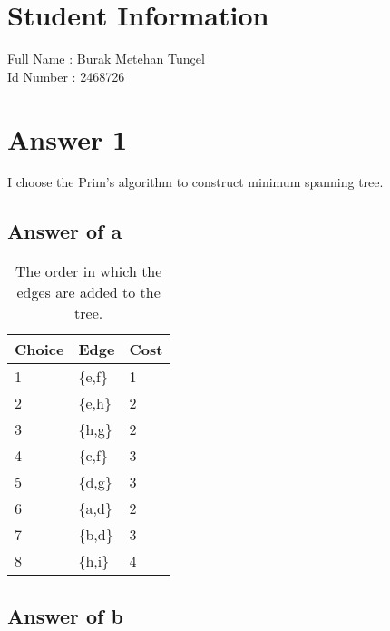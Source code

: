 \documentclass[12pt]{article}
\begin{document}
\section*{Student Information } 
Full Name :  Burak Metehan Tunçel \\
Id Number :  2468726 \\


\section*{Answer 1}

I choose the Prim's algorithm to construct minimum spanning tree.

\subsection*{Answer of a}

\begin{table}[h!]
    \centering
    \begin{tabular}{| p{2cm} | p{2cm} | p{2cm}|}
        \hline
        \rowcolor{orange}
        Choice & Edge & Cost\\
        \hline
        \rowcolor{gray}
        1 & \{e,f\} & 1\\
        2 & \{e,h\} & 2\\
        \rowcolor{gray}
        3 & \{h,g\} & 2\\
        4 & \{c,f\} & 3\\
        \rowcolor{gray}
        5 & \{d,g\} & 3\\
        6 & \{a,d\} & 2\\
        \rowcolor{gray}
        7 & \{b,d\} & 3\\
        8 & \{h,i\} & 4\\
        \hline
    \end{tabular}
    \caption{The order in which the edges are added to the tree.}
    \label{tab:my_label}
\end{table}

\subsection*{Answer of b}
\end{document}
